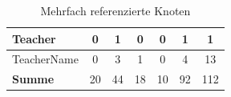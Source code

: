 \begin{table}[htb]
\begin{tabular}{|l|c|c|c|c|c|c|}
            Teacher                               & 0             & 1              & 0               & 0             & 1              & 1             \\ \hline
            TeacherName                           & 0             & 3              & 1               & 0             & 4              & 13            \\ \hline
            \hline
            \textbf{Summe}                        & 20            & 44             & 18              & 10            & 92             & 112           \\ \hline
        \end{tabular}
        \caption{Mehrfach referenzierte Knoten}
        \label{table:findingsTeachersFiguresSharedNodes}
    \end{table}
